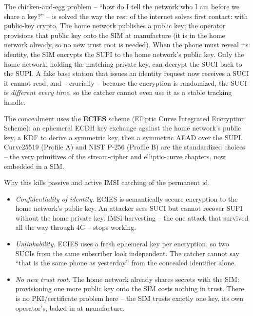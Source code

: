 \begin{intuitionbox}
The chicken-and-egg problem -- ``how do I tell the network who I am before we share a key?'' -- is solved the way the rest of the internet solves first contact: with public-key crypto. The home network publishes a public key; the operator provisions that public key onto the SIM at manufacture (it is in the home network already, so no new trust root is needed). When the phone must reveal its identity, the SIM encrypts the SUPI to the home network's public key. Only the home network, holding the matching private key, can decrypt the SUCI back to the SUPI. A fake base station that issues an identity request now receives a SUCI it cannot read, and -- crucially -- because the encryption is randomized, the SUCI is \emph{different every time}, so the catcher cannot even use it as a stable tracking handle.
\end{intuitionbox}

The concealment uses the \textbf{ECIES} scheme (Elliptic Curve Integrated Encryption Scheme): an ephemeral ECDH key exchange against the home network's public key, a KDF to derive a symmetric key, then a symmetric AEAD over the SUPI. Curve25519 (Profile A) and NIST P-256 (Profile B) are the standardized choices -- the very primitives of the stream-cipher and elliptic-curve chapters, now embedded in a SIM.

\begin{whybox}
Why this kills passive and active IMSI catching of the permanent id.
\begin{itemize}
  \item \emph{Confidentiality of identity.} ECIES is semantically secure encryption to the home network's public key. An attacker sees SUCI but cannot recover SUPI without the home private key. IMSI harvesting -- the one attack that survived all the way through 4G -- stops working.
  \item \emph{Unlinkability.} ECIES uses a fresh ephemeral key per encryption, so two SUCIs from the same subscriber look independent. The catcher cannot say ``that is the same phone as yesterday'' from the concealed identifier alone.
  \item \emph{No new trust root.} The home network already shares secrets with the SIM; provisioning one more public key onto the SIM costs nothing in trust. There is no PKI/certificate problem here -- the SIM trusts exactly one key, its own operator's, baked in at manufacture.
\end{itemize}
\end{whybox}

